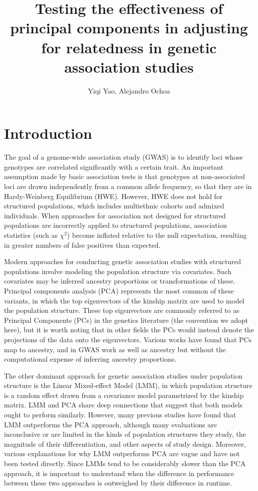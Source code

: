 \documentclass[12pt]{article}
\title{Testing the effectiveness of principal components in adjusting for relatedness in genetic association studies}
\author{Yiqi Yao, Alejandro Ochoa}
\begin{document}
\maketitle
	
\section{Introduction} 

The goal of a genome-wide association study (GWAS) is to identify loci whose genotypes are correlated significantly with a certain trait.
An important assumption made by basic association tests is that genotypes at non-associated loci are drawn independently from a common allele frequency, so that they are in Hardy-Weinberg Equilibrium (HWE).
However, HWE does not hold for structured populations, which includes multiethnic cohorts and admixed individuals.
When approaches for association not designed for structured populations are incorrectly applied to structured populations, association statistics (such as $\chi^2$) become inflated relative to the null expectation, resulting in greater numbers of false positives than expected.

Modern approaches for conducting genetic association studies with structured populations involve modeling the population structure via covariates.
Such covariates may be inferred ancestry proportions or transformations of these.
Principal components analysis (PCA) represents the most common of these variants, in which the top eigenvectors of the kinship matrix are used to model the population structure.
These top eigenvectors are commonly referred to as Principal Components (PCs) in the genetics literature (the convention we adopt here), but it is worth noting that in other fields the PCs would instead denote the projections of the data onto the eigenvectors.
Various works have found that PCs map to ancestry, and in GWAS work as well as ancestry but without the computational expense of inferring ancestry proportions.

The other dominant approach for genetic association studies under population structure is the Linear Mixed-effect Model (LMM), in which population structure is a random effect drawn from a covariance model parametrized by the kinship matrix.
LMM and PCA share deep connections that suggest that both models ought to perform similarly.
However, many previous studies have found that LMM outperforms the PCA approach, although many evaluations are inconclusive or are limited in the kinds of population structures they study, the magnitude of their differentiation, and other aspects of study design.
Moreover, various explanations for why LMM outperforms PCA are vague and have not been tested directly.
Since LMMs tend to be considerably slower than the PCA approach, it is important to understand when the difference in performance between these two approaches is outweighed by their difference in runtime.
\end{document}
